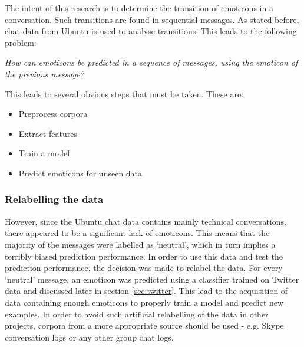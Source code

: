 
\begin{comment}
Problem: (roughly 1-2 pages)
• Explain the problem; what kind of assumptions / observations you have about the problem

\red{Find out what should be actually in this section} \\
\end{comment}

The intent of this research is to determine the transition of emoticons in a conversation. Such transitions are found in sequential messages. As stated before, chat data from Ubuntu is used to analyse transitions. This leads to the following problem: 
\begin{center}
\textit{How can emoticons be predicted in a sequence of messages, using the emoticon of the previous message?}
\end{center}

This leads to several obvious steps that must be taken. These are:
\begin{itemize}
\item Preprocess corpora
\item Extract features
\item Train a model
\item Predict emoticons for unseen data
\end{itemize}

\subsubsection*{Relabelling the data} 
However, since the Ubuntu chat data contains mainly technical conversations, there appeared to be a significant lack of emoticons. This means that the majority of the messages were labelled as `neutral', which in turn implies a terribly biased prediction performance. In order to use this data and test the prediction performance, the decision was made to relabel the data. For every `neutral' message, an emoticon was predicted using a classifier trained on Twitter data and discussed later in section \ref{sec:twitter}. This lead to the acquisition of data containing enough emoticons to properly train a model and predict new examples. In order to avoid such artificial relabelling of the data in other projects, corpora from a more appropriate source should be used - e.g. Skype conversation logs or any other group chat logs. 


\begin{comment}
However, the Ubuntu chat data does not contain enough emoticons. Therefore, before training a model, each message which does not contain an emoticon must first be relabeled. This requires the implementation of another model which, given a single, independent message, predicts a corresponding emoticon. This means that a different model must be trained on a different corpus. As mentioned before, a Twitter data can be used for training this model. Once emoticons are predicted for the Ubuntu chat messages, the newly obtained corpus might be eventually used for emoticon prediction in a sequence of messages.
\end{comment}


